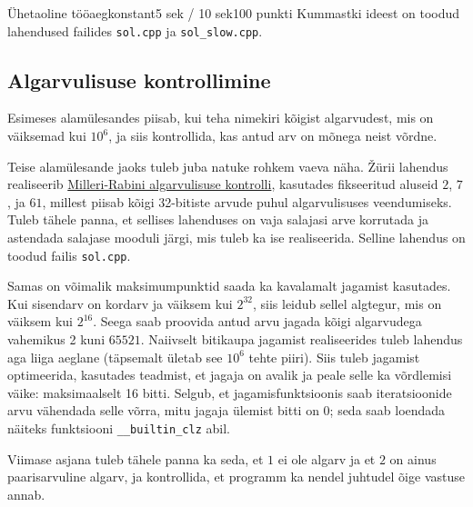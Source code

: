 \begin{yl}{7}{Ühetaoline tööaeg}{konstant}{5 sek / 10 sek}{100 punkti}
  Kummastki ideest on toodud lahendused failides \verb'sol.cpp' ja \verb'sol_slow.cpp'.

  \subsection*{Algarvulisuse kontrollimine}

  Esimeses alamülesandes piisab, kui teha nimekiri kõigist algarvudest, mis on väiksemad kui $10^6$, ja siis kontrollida, kas antud arv on mõnega neist võrdne.

  Teise alamülesande jaoks tuleb juba natuke rohkem vaeva näha. Žürii lahendus realiseerib \href{https://en.wikipedia.org/wiki/Miller%E2%80%93Rabin_primality_test}{Milleri-Rabini algarvulisuse kontrolli}, kasutades fikseeritud aluseid $2$, $7$, ja $61$, millest piisab kõigi 32-bitiste arvude puhul algarvulisuses veendumiseks. Tuleb tähele panna, et sellises lahenduses on vaja salajasi arve korrutada ja astendada salajase mooduli järgi, mis tuleb ka ise realiseerida. Selline lahendus on toodud failis \verb'sol.cpp'.

  Samas on võimalik maksimumpunktid saada ka kavalamalt jagamist kasutades. Kui sisendarv on kordarv ja väiksem kui $2^{32}$, siis leidub sellel algtegur, mis on väiksem kui $2^{16}$. Seega saab proovida antud arvu jagada kõigi algarvudega vahemikus 2 kuni $65521$. Naiivselt bitikaupa jagamist realiseerides tuleb lahendus aga liiga aeglane (täpsemalt ületab see $10^6$ tehte piiri). Siis tuleb jagamist optimeerida, kasutades teadmist, et jagaja on avalik ja peale selle ka võrdlemisi väike: maksimaalselt 16 bitti. Selgub, et jagamisfunktsioonis saab iteratsioonide arvu vähendada selle võrra, mitu jagaja ülemist bitti on $0$; seda saab loendada näiteks funktsiooni \verb'__builtin_clz' abil.

  Viimase asjana tuleb tähele panna ka seda, et $1$ ei ole algarv ja et $2$ on ainus paarisarvuline algarv, ja kontrollida, et programm ka nendel juhtudel õige vastuse annab.
\end{yl}
